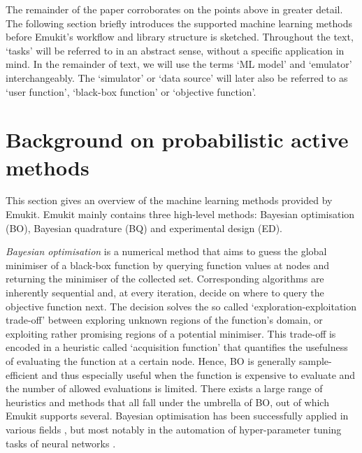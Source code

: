 The remainder of the paper corroborates on the points above in greater detail. The following section briefly introduces the supported machine learning methods before Emukit's workflow and library structure is sketched.
Throughout the text, `tasks' will be referred to in an abstract sense, without a specific application in mind.
In the remainder of text, we will use the terms `ML model' and `emulator' interchangeably. The `simulator' or `data source' will later also be referred to as `user function', `black-box function' or `objective function'.

\section{Background on probabilistic active methods}\label{sec:background}

This section gives an overview of the machine learning methods provided by Emukit.
Emukit mainly contains three high-level methods: Bayesian optimisation (BO), Bayesian quadrature (BQ) and experimental design (ED).

\emph{Bayesian optimisation} \cite{Mockus1978, Garnett2023} is a numerical method that aims to guess the global minimiser of a black-box function by querying function values at nodes and returning the minimiser of the collected set. Corresponding algorithms are inherently sequential and, at every iteration, decide on where to query the objective function next. The decision solves the so called `exploration-exploitation trade-off' between exploring unknown regions of the function's domain, or exploiting rather promising regions of a potential minimiser. This trade-off is encoded in a heuristic called `acquisition function' that quantifies the usefulness of evaluating the function at a certain node. Hence, BO is generally sample-efficient and thus especially useful when the function is expensive to evaluate and the number of allowed evaluations is limited. There exists a large range of heuristics and methods that all fall under the umbrella of BO, out of which Emukit supports several. Bayesian optimisation has been successfully applied in various fields , but most notably in the automation of hyper-parameter tuning tasks of neural networks \cite{snoek2012practical}.

